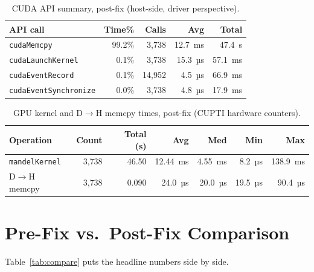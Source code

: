 \documentclass[
	english,
	letterpaper, oneside
]{article}
\begin{document}
\begin{table}[H]
    \centering
    \caption{CUDA API summary, post-fix (host-side, driver perspective).}
    \label{tab:cuda-api-post}
    \begin{tabular}{lrrrr}
        \hline
        API call & Time\% & Calls & Avg & Total \\
        \hline
        \texttt{cudaMemcpy}          & 99.2\% & 3{,}738 & 12.7~ms  & 47.4~s   \\
        \texttt{cudaLaunchKernel}    &  0.1\% & 3{,}738 & 15.3~µs  & 57.1~ms  \\
        \texttt{cudaEventRecord}     &  0.1\% & 14{,}952& 4.5~µs   & 66.9~ms  \\
        \texttt{cudaEventSynchronize}&  0.0\% & 3{,}738 & 4.8~µs   & 17.9~ms  \\
        \hline
    \end{tabular}
\end{table}

\begin{table}[H]
    \centering
    \caption{GPU kernel and D$\rightarrow$H memcpy times, post-fix
             (CUPTI hardware counters).}
    \label{tab:gpu-post}
    \begin{tabular}{lrrrrrr}
        \hline
        Operation & Count & Total (s) & Avg & Med & Min & Max \\
        \hline
        \texttt{mandelKernel}         & 3{,}738 & 46.50  & 12.44~ms & 4.55~ms & 8.2~µs  & 138.9~ms \\
        D$\rightarrow$H memcpy        & 3{,}738 &  0.090 & 24.0~µs  & 20.0~µs & 19.5~µs &  90.4~µs \\
        \hline
    \end{tabular}
\end{table}

\section{Pre-Fix vs.\ Post-Fix Comparison}

Table~\ref{tab:compare} puts the headline numbers side by side.
\end{document}
